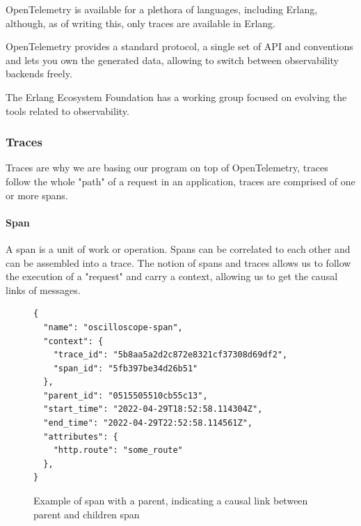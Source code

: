     OpenTelemetry is available for a plethora of languages, including Erlang, although, as of writing this, only traces are available in Erlang. 
    
    OpenTelemetry provides a standard protocol, a single set of API and conventions and lets you own the generated data, allowing to switch between observability backends freely.
    
    The Erlang Ecosystem Foundation has a working group focused on evolving the tools related to observability. 
    
    \subsubsection{Traces}
        Traces are why we are basing our program on top of OpenTelemetry, traces follow the whole "path" of a request in an application, traces are comprised of one or more spans.
        
        \paragraph{Span} A span is a unit  of work or operation. Spans can be correlated to each other and can be assembled into a trace.
    The notion of spans and traces allows us to follow the execution of a "request" and carry a context, allowing us to get the causal links of messages. \cite{otel-t} 
    \begin{figure}[H]
    \begin{verbatim} 
{
  "name": "oscilloscope-span",
  "context": {
    "trace_id": "5b8aa5a2d2c872e8321cf37308d69df2",
    "span_id": "5fb397be34d26b51"
  },
  "parent_id": "0515505510cb55c13",
  "start_time": "2022-04-29T18:52:58.114304Z",
  "end_time": "2022-04-29T22:52:58.114561Z",
  "attributes": {
    "http.route": "some_route"
  },
}
    \end{verbatim}

        \caption{Example of span with a parent, indicating a causal link between parent and children span \cite{otel-t}}

    \end{figure}

